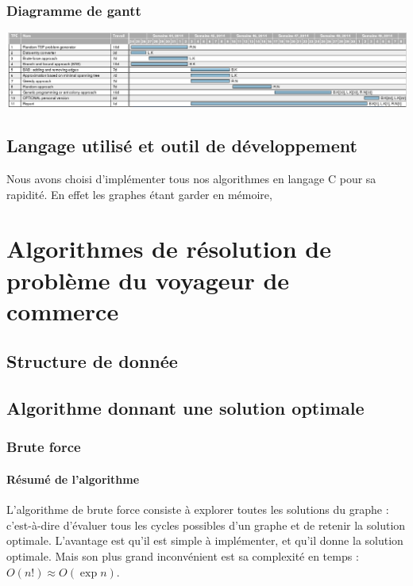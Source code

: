 \documentclass[10pt,a4paper]{report}
\begin{document}
		\subsubsection{Diagramme de gantt}
		
			\includegraphics[scale=0.37]{./Ressource/planning_AA.png}
		
	
	\subsection{Langage utilisé et outil de développement}
	\begin{flushleft}
	Nous avons choisi d'implémenter tous nos algorithmes en langage C  pour sa rapidité. En effet les graphes étant garder en mémoire, 
	\end{flushleft}
	
\section{Algorithmes de résolution de problème du voyageur de commerce}

	\subsection{Structure de donnée}
	
	\subsection{Algorithme donnant une solution optimale}
		\subsubsection{Brute force}
		
		\paragraph{Résumé de l'algorithme}
		\begin{flushleft}
		L'algorithme de brute force consiste à explorer toutes les solutions du graphe : c'est-à-dire d'évaluer tous les cycles possibles d'un graphe et de retenir la solution optimale.
		L'avantage est qu'il est simple à implémenter, et qu'il donne la solution optimale.
		Mais son plus grand inconvénient est sa complexité en temps :  $O(n!) \approx O(\exp n)$.
		\end{flushleft}
\end{document}
